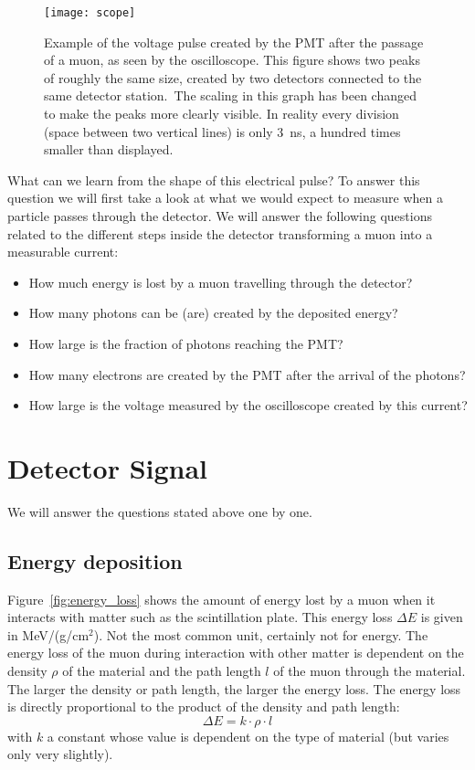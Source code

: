 \begin{figure}\begin{center}
\texttt{[image: scope]}%
\caption{Example of the voltage pulse created by the PMT after the passage of a muon, as seen by the oscilloscope. This figure shows two peaks of roughly the same size, created by two detectors connected to the same detector station.\protect\footnotemark ~The scaling in this graph has been changed to make the peaks more clearly visible. In reality every division (space between two vertical lines) is only 3~ns, a hundred times smaller than displayed.}\label{fig:scope}
\end{center}\end{figure}

What can we learn from the shape of this electrical pulse? To answer this question we will first take a look at what we would expect to measure when a particle passes through the detector. We will answer the following questions related to the different steps inside the detector transforming a muon into a measurable current:
\begin{itemize}
\item How much energy is lost by a muon travelling through the detector?
\item How many photons can be (are) created by the deposited energy?
\item How large is the fraction of photons reaching the PMT?
\item How many electrons are created by the PMT after the arrival of the photons?
\item How large is the voltage measured by the oscilloscope created by this current?
\end{itemize}

\section{Detector Signal}
We will answer the questions stated above one by one.
\subsection{Energy deposition}
Figure~\ref{fig:energy_loss} shows the amount of energy lost by a muon when it interacts with matter such as the scintillation plate. This energy loss $\Delta E$ is given in MeV/(g/cm$^2$). Not the most common unit, certainly not for energy. The energy loss of the muon during interaction with other matter is dependent on the density $\rho$ of the material and the path length $l$ of the muon through the material. The larger the density or path length, the larger the energy loss. The energy loss is directly proportional to the product of the density and path length:
\begin{equation}
\Delta E = k \cdot \rho \cdot l
\end{equation}
with $k$ a constant whose value is dependent on the type of material (but varies only very slightly).

